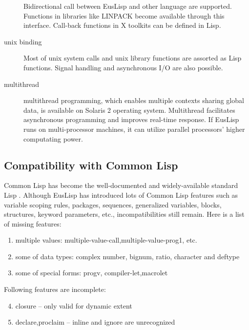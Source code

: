 \begin{description}
Bidirectional call between EusLisp and other language are supported.
Functions in libraries like LINPACK become available through this interface.
Call-back functions in X toolkits can be defined in Lisp.
\item [unix binding]
Most of unix system calls and unix library functions are assorted as Lisp
functions. Signal handling and asynchronous I/O are also possible.
\item [multithread] multithread programming, which enables multiple
contexts sharing global data, is available on Solaris 2 operating system.
Multithread facilitates asynchronous programming and improves real-time
response\cite{MTEus1,MTEus2}.
If EusLisp runs on multi-processor machines, it can utilize 
parallel processors' higher computating power.
\end{description}

\subsection{Compatibility with Common Lisp}

Common Lisp has become the well-documented and widely-available standard Lisp
\cite{CLtL,CLtL2}.
Although EusLisp has introduced lots of Common Lisp features
such as variable scoping rules, packages, sequences, generalized variables,
blocks, structures, keyword parameters, etc.,
incompatibilities still remain.
Here is a list of missing features:

\begin{enumerate}
\item multiple values:
      multiple-value-call,multiple-value-prog1, etc.
\item some of data types:
      complex number, bignum, ratio, character and deftype
\item some of special forms:
      progv, compiler-let,macrolet
\end{enumerate}

Following features are incomplete:
\begin{enumerate}
\setcounter{enumi}{3}
\item  closure -- only valid for dynamic extent
\item  declare,proclaim -- inline and ignore are unrecognized
\end{enumerate}

